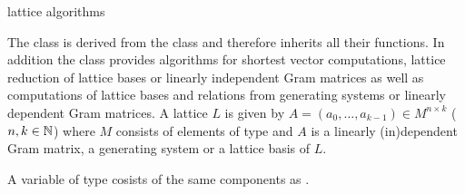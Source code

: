 
\newcommand{\factor}{\mathit{factor}}
\newcommand{\li}{\mathit{li}}



\NAME

 \dotfill lattice algorithms



\ABSTRACT

The class  is derived from the class  and therefore
inherits all their functions.  In addition the class  provides algorithms
for shortest vector computations, lattice reduction of lattice bases or linearly independent
Gram matrices as well as computations of lattice bases and relations from generating systems or
linearly dependent Gram matrices.  A lattice $L$ is given by $A = (a_0, \dots, a_{k-1}) \in M^{n
  \times k}$ ($n,k \in \mathbb{N}$) where $M$ consists of elements of type  and $A$ is
a linearly (in)dependent Gram matrix, a generating system or a lattice basis of $L$.



\DESCRIPTION

A variable of type  cosists of the same components as .

